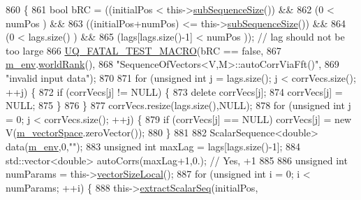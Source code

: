 \begin{DoxyCode}
860 \{
861   \textcolor{keywordtype}{bool} bRC = ((initialPos          <  this->\hyperlink{class_q_u_e_s_o_1_1_sequence_of_vectors_a0224bd3e961d86af5d2886301c0c2b86}{subSequenceSize}()) &&
862               (0                   <  numPos                 ) &&
863               ((initialPos+numPos) <= this->\hyperlink{class_q_u_e_s_o_1_1_sequence_of_vectors_a0224bd3e961d86af5d2886301c0c2b86}{subSequenceSize}()) &&
864               (0                   <  lags.size()            ) &&
865               (lags[lags.size()-1] <  numPos                 )); \textcolor{comment}{// lag should not be too large}
866   \hyperlink{_defines_8h_a56d63d18d0a6d45757de47fcc06f574d}{UQ\_FATAL\_TEST\_MACRO}(bRC == \textcolor{keyword}{false},
867                       \hyperlink{class_q_u_e_s_o_1_1_base_vector_sequence_a8e8824d2a63c5a43bcc6473e3a0491e8}{m\_env}.\hyperlink{class_q_u_e_s_o_1_1_base_environment_a78b57112bbd0e6dd0e8afec00b40ffa7}{worldRank}(),
868                       \textcolor{stringliteral}{"SequenceOfVectors<V,M>::autoCorrViaFft()"},
869                       \textcolor{stringliteral}{"invalid input data"});
870 
871   \textcolor{keywordflow}{for} (\textcolor{keywordtype}{unsigned} \textcolor{keywordtype}{int} j = lags.size(); j < corrVecs.size(); ++j) \{
872     \textcolor{keywordflow}{if} (corrVecs[j] != NULL) \{
873       \textcolor{keyword}{delete} corrVecs[j];
874       corrVecs[j] = NULL;
875     \}
876   \}
877   corrVecs.resize(lags.size(),NULL);
878   \textcolor{keywordflow}{for} (\textcolor{keywordtype}{unsigned} \textcolor{keywordtype}{int} j = 0;           j < corrVecs.size(); ++j) \{
879     \textcolor{keywordflow}{if} (corrVecs[j] == NULL) corrVecs[j] = \textcolor{keyword}{new} V(\hyperlink{class_q_u_e_s_o_1_1_base_vector_sequence_a4bd171e39ed050ff105c808336f35198}{m\_vectorSpace}.zeroVector());
880   \}
881 
882   ScalarSequence<double> data(\hyperlink{class_q_u_e_s_o_1_1_base_vector_sequence_a8e8824d2a63c5a43bcc6473e3a0491e8}{m\_env},0,\textcolor{stringliteral}{""});
883   \textcolor{keywordtype}{unsigned} \textcolor{keywordtype}{int} maxLag = lags[lags.size()-1];
884   std::vector<double> autoCorrs(maxLag+1,0.); \textcolor{comment}{// Yes, +1}
885 
886   \textcolor{keywordtype}{unsigned} \textcolor{keywordtype}{int} numParams = this->\hyperlink{class_q_u_e_s_o_1_1_base_vector_sequence_a2fefedf9e5b90f22881103b3f92555f6}{vectorSizeLocal}();
887   \textcolor{keywordflow}{for} (\textcolor{keywordtype}{unsigned} \textcolor{keywordtype}{int} i = 0; i < numParams; ++i) \{
888     this->\hyperlink{class_q_u_e_s_o_1_1_sequence_of_vectors_ac977b3b26a6af2ae727671f1246262fd}{extractScalarSeq}(initialPos,

\end{DoxyCode}
